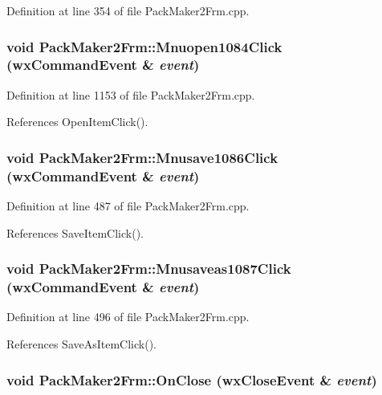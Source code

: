 Definition at line 354 of file Pack\-Maker2Frm.cpp.
\subsubsection{\setlength{\rightskip}{0pt plus 5cm}void Pack\-Maker2Frm::Mnuopen1084Click (wx\-Command\-Event \& {\em event})}\label{class_pack_maker2_frm_8939d5bbefd3c814a81abb56d1c57b78}




Definition at line 1153 of file Pack\-Maker2Frm.cpp.

References Open\-Item\-Click().
\subsubsection{\setlength{\rightskip}{0pt plus 5cm}void Pack\-Maker2Frm::Mnusave1086Click (wx\-Command\-Event \& {\em event})}\label{class_pack_maker2_frm_79769da5a9afccc0b33c6fdf04e8b865}




Definition at line 487 of file Pack\-Maker2Frm.cpp.

References Save\-Item\-Click().
\subsubsection{\setlength{\rightskip}{0pt plus 5cm}void Pack\-Maker2Frm::Mnusaveas1087Click (wx\-Command\-Event \& {\em event})}\label{class_pack_maker2_frm_88e5465e6083edc4e63eff1e1515e92d}




Definition at line 496 of file Pack\-Maker2Frm.cpp.

References Save\-As\-Item\-Click().
\subsubsection{\setlength{\rightskip}{0pt plus 5cm}void Pack\-Maker2Frm::On\-Close (wx\-Close\-Event \& {\em event})\hspace{0.3cm}{\tt  [private]}}\label{class_pack_maker2_frm_9944b85461d5ab8c7a1349fc1d11f733}




